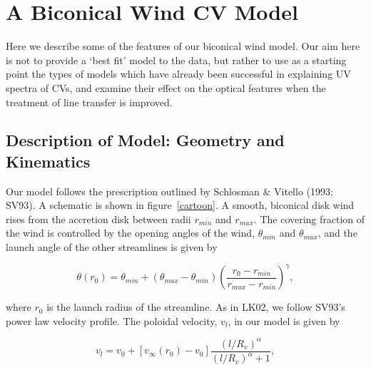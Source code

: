 \documentclass[preprint, a4paper, 11pt]{aastex}
\begin{document}
%





%
%

\section{A Biconical Wind CV Model}

Here we describe some of the features of our biconical wind model. Our aim here is not
to provide a `best fit' model to the data, but rather to use as a starting point
the types of models which have already been successful in explaining UV spectra of CVs,
and examine their effect on the optical features when the treatment of line transfer
is improved.

\subsection{Description of Model: Geometry and Kinematics}

Our model follows the prescription outlined by Schlosman \& Vitello (1993; SV93). A schematic is shown
in figure~\ref{cartoon}. A smooth, biconical
disk wind rises from the accretion disk between radii $r_{min}$ and $r_{max}$. The covering fraction of the wind is 
controlled by the opening angles of the wind, $\theta_{min}$ and $\theta_{max}$, and the launch angle of
the other streamlines is given by

\begin{equation}
\theta(r_0) = \theta_{min} + (\theta_{max} - \theta_{min}) \left(\frac{r_0 - r_{min}}{r_{max} - r_{min}} \right)^{\gamma},
\label{theta}
\end{equation}

where $r_0$ is the launch radius of the streamline.
As in LK02, we follow SV93's power law
velocity profile. The poloidal velocity, $v_l$, in our model is given by

\begin{equation}
v_l=v_0+\left[v_{\infty}(r_0)-v_0\right]\frac{\left(l/R_v\right)^{\alpha}}{\left(l/R_v\right)^{\alpha}+1},
\label{v_law}
\end{equation}
\end{document}
